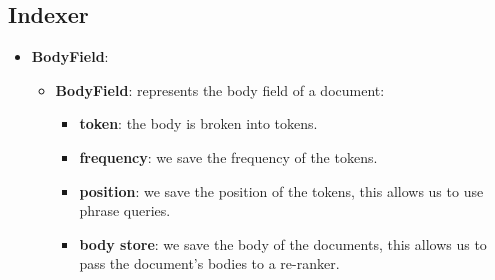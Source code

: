 \newpage
\subsection{Indexer}

\begin{itemize}
    \item \textbf{BodyField}: \begin{itemize}
                                  \item \textbf{BodyField}: represents the body field of a document: \begin{itemize}
                                                                                                         \item \textbf{token}: the body is broken into tokens.
                                                                                                         \item \textbf{frequency}: we save the frequency of the tokens.
                                                                                                         \item \textbf{position}:  we save the position of the tokens, this allows us to use phrase queries.
                                                                                                         \item \textbf{body store}: we save the body of the documents, this allows us to pass the document's bodies to a re-ranker.


\end{itemize}
\end{itemize}
\end{itemize}
